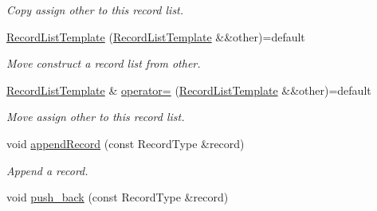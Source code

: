 \begin{DoxyCompactItemize}
\begin{DoxyCompactList}\small\item\em Copy assign {\itshape other} to this record list. \end{DoxyCompactList}\item 
\hyperlink{class_mdt_1_1_plain_text_1_1_record_list_template_ac0420a409eaa29f9716662faec808bb2}{Record\+List\+Template} (\hyperlink{class_mdt_1_1_plain_text_1_1_record_list_template}{Record\+List\+Template} \&\&other)=default\hypertarget{class_mdt_1_1_plain_text_1_1_record_list_template_ac0420a409eaa29f9716662faec808bb2}{}\label{class_mdt_1_1_plain_text_1_1_record_list_template_ac0420a409eaa29f9716662faec808bb2}

\begin{DoxyCompactList}\small\item\em Move construct a record list from {\itshape other}. \end{DoxyCompactList}\item 
\hyperlink{class_mdt_1_1_plain_text_1_1_record_list_template}{Record\+List\+Template} \& \hyperlink{class_mdt_1_1_plain_text_1_1_record_list_template_a323367ad799d8ec5398e56e6de9d933e}{operator=} (\hyperlink{class_mdt_1_1_plain_text_1_1_record_list_template}{Record\+List\+Template} \&\&other)=default\hypertarget{class_mdt_1_1_plain_text_1_1_record_list_template_a323367ad799d8ec5398e56e6de9d933e}{}\label{class_mdt_1_1_plain_text_1_1_record_list_template_a323367ad799d8ec5398e56e6de9d933e}

\begin{DoxyCompactList}\small\item\em Move assign {\itshape other} to this record list. \end{DoxyCompactList}\item 
void \hyperlink{class_mdt_1_1_plain_text_1_1_record_list_template_acf9720dd89942675131a6784277693de}{append\+Record} (const Record\+Type \&record)\hypertarget{class_mdt_1_1_plain_text_1_1_record_list_template_acf9720dd89942675131a6784277693de}{}\label{class_mdt_1_1_plain_text_1_1_record_list_template_acf9720dd89942675131a6784277693de}

\begin{DoxyCompactList}\small\item\em Append a record. \end{DoxyCompactList}\item 
void \hyperlink{class_mdt_1_1_plain_text_1_1_record_list_template_a0d87d865b6c32aa07f9f5d85a3139a8a}{push\+\_\+back} (const Record\+Type \&record)\hypertarget{class_mdt_1_1_plain_text_1_1_record_list_template_a0d87d865b6c32aa07f9f5d85a3139a8a}{}\label{class_mdt_1_1_plain_text_1_1_record_list_template_a0d87d865b6c32aa07f9f5d85a3139a8a}


\end{DoxyCompactItemize}

